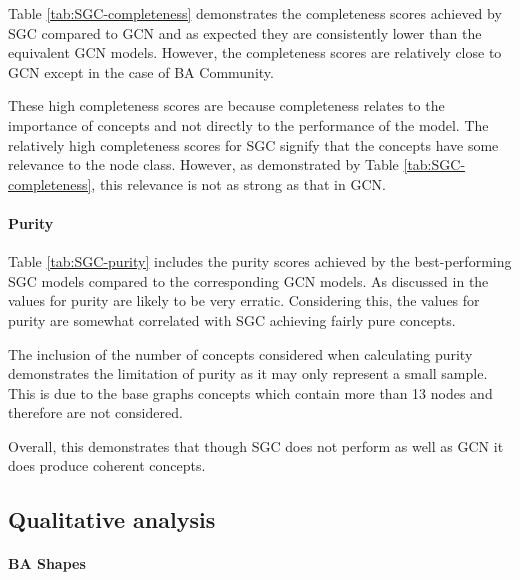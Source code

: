 Table \ref{tab:SGC-completeness} demonstrates the completeness scores achieved by SGC compared to GCN and as expected they are consistently lower than the equivalent GCN models.
However, the completeness scores are relatively close to GCN except in the case of BA Community.

These high completeness scores are because completeness relates to the importance of concepts and not directly to the performance of the model.
The relatively high completeness scores for SGC signify that the concepts have some relevance to the node class.
However, as demonstrated by Table \ref{tab:SGC-completeness}, this relevance is not as strong as that in GCN.

\paragraph{Purity}


Table \ref{tab:SGC-purity} includes the purity scores achieved by the best-performing SGC models compared to the corresponding GCN models.
As discussed in  the values for purity are likely to be very erratic.
Considering this, the values for purity are somewhat correlated with SGC achieving fairly pure concepts.

The inclusion of the number of concepts considered when calculating purity demonstrates the limitation of purity as it may only represent a small sample.
This is due to the base graphs concepts which contain more than 13 nodes and therefore are not considered.

Overall, this demonstrates that though SGC does not perform as well as GCN it does produce coherent concepts.

\subsection{Qualitative analysis}
\label{sec:concept-analysis}

\paragraph{BA Shapes}

